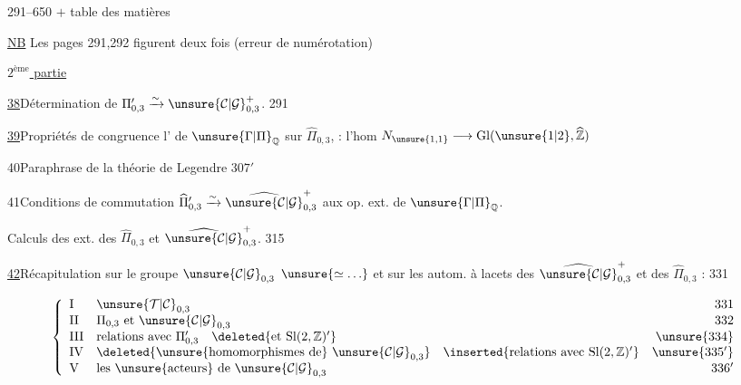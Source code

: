 
 291--650 $+$ table des matières

\uline{NB} Les pages 291,292 figurent deux fois
(erreur de numérotation)


\uline{$2^{\text{ème}}$ partie}\quad
{}

\uline{38}\quad Détermination de
$\Pi'_{0,3}\xrightarrow{\sim}\unsure{\mathcal C|\mathcal G}_{0,3}^{+}$.
\hfill 291

\uline{39}\quad Propriétés de congruence  l'
de $\unsure{\Gamma|\Pi}_{\mathbb Q}$ sur $\widehat{\Pi}_{0,3}$,
 : l'hom
$N_{\unsure{1,1}}\longrightarrow \mathrm{Gl}(\unsure{1|2},\widehat{\mathbb Z})$
\hfill {}

40\quad Paraphrase  de la
théorie de Legendre
\hfill $307'$

41\quad Conditions de commutation 
$\widehat{\Pi}'_{0,3}\xrightarrow{\sim}\widehat{\unsure{\mathcal C|\mathcal G}}_{0,3}^{+}$
aux op. ext. de $\unsure{\Gamma|\Pi}_{\mathbb Q}$.
\hfill {}

Calculs des  ext. des $\widehat{\Pi}_{0,3}$ et
 $\widehat{\unsure{\mathcal C|\mathcal G}}_{0,3}^{+}$.
\hfill 315

\uline{42}\quad Récapitulation sur le groupe
$\unsure{\mathcal C|\mathcal G}_{0,3}$
$\unsure{\simeq\ldots}$ et sur les autom. à lacets des
$\widehat{\unsure{\mathcal C|\mathcal G}}_{0,3}^{+}$ et des
$\widehat{\Pi}_{0,3}$ :
\hfill 331

\[
\left\{
\begin{array}{llr}
\mathrm{I}&\unsure{\mathcal T|\mathcal C}_{0,3}&331\\
\mathrm{II}&\Pi_{0,3}\text{ et }\unsure{\mathcal C|\mathcal G}_{0,3}&332\\
\mathrm{III}&\text{relations avec }\Pi'_{0,3}\quad
\deleted{\text{et }\mathrm{Sl}(2,\mathbb Z)'}&\unsure{334}\\
\mathrm{IV}&\deleted{\text{\unsure{homomorphismes de}}\ \unsure{\mathcal C|\mathcal G}_{0,3}}\quad
\inserted{\text{relations avec }\mathrm{Sl}(2,\mathbb Z)'}&\unsure{335'}\\
\mathrm{V}&\text{les \unsure{acteurs} de }\unsure{\mathcal C|\mathcal G}_{0,3}&336'
\end{array}
\right.
\]

